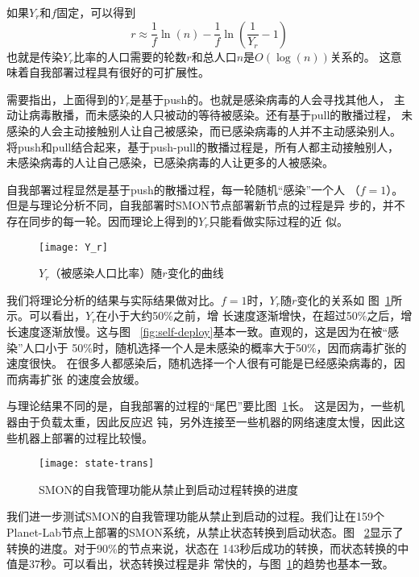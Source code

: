 如果$Y_r$和$f$固定，可以得到
\begin{equation*}
r \approx \frac{1}{f} \ln(n) - \frac{1}{f} \ln(\frac{1}{Y_r} - 1)
\end{equation*}
也就是传染$Y_r$比率的人口需要的轮数$r$和总人口$n$是$O(\log(n))$关系的。
这意味着自我部署过程具有很好的可扩展性。

需要指出，上面得到的$Y_r$是基于push的。也就是感染病毒的人会寻找其他人，
主动让病毒散播，而未感染的人只被动的等待被感染。还有基于pull的散播过程，
未感染的人会主动接触别人让自己被感染，而已感染病毒的人并不主动感染别人。
将push和pull结合起来，基于push-pull的散播过程是，所有人都主动接触别人，
未感染病毒的人让自己感染，已感染病毒的人让更多的人被感染。

自我部署过程显然是基于push的散播过程，每一轮随机“感染”一个人
（$f=1$）。但是与理论分析不同，自我部署时SMON节点部署新节点的过程是异
步的，并不存在同步的每一轮。因而理论上得到的$Y_r$只能看做实际过程的近
似。

\begin{figure}
\centering
  \begin{minipage}{0.8\linewidth}
    \centering
    \texttt{[image: Y\_r]}
    \caption{$Y_r$（被感染人口比率）随$r$变化的曲线}
    \label{fig:self-deploy_Yr}
  \end{minipage}
\end{figure}


我们将理论分析的结果与实际结果做对比。$f=1$时，$Y_r$随$r$变化的关系如
图~\ref{fig:self-deploy_Yr}所示。可以看出，$Y_r$在小于大约50\%之前，增
长速度逐渐增快，在超过50\%之后，增长速度逐渐放慢。这与图~
\ref{fig:self-deploy}基本一致。直观的，这是因为在被“感染”人口小于
50\%时，随机选择一个人是未感染的概率大于50\%，因而病毒扩张的速度很快。
在很多人都感染后，随机选择一个人很有可能是已经感染病毒的，因而病毒扩张
的速度会放缓。

与理论结果不同的是，自我部署的过程的“尾巴”要比图~\ref{fig:self-deploy_Yr}长。
这是因为，一些机器由于负载太重，因此反应迟
钝，另外连接至一些机器的网络速度太慢，因此这些机器上部署的过程比较慢。


\begin{figure}
\centering
  \begin{minipage}{0.8\linewidth}
    \centering
    \texttt{[image: state-trans]}
    \caption{SMON的自我管理功能从禁止到启动过程转换的进度}
    \label{fig:state-transition}
  \end{minipage}
\end{figure}

我们进一步测试SMON的自我管理功能从禁止到启动的过程。我们让在159个
Planet-Lab节点上部署的SMON系统，从禁止状态转换到启动状态。图~
\ref{fig:state-transition}显示了转换的进度。对于90\%的节点来说，状态在
143秒后成功的转换，而状态转换的中值是37秒。可以看出，状态转换过程是非
常快的，与图~\ref{fig:self-deploy_Yr}的趋势也基本一致。

